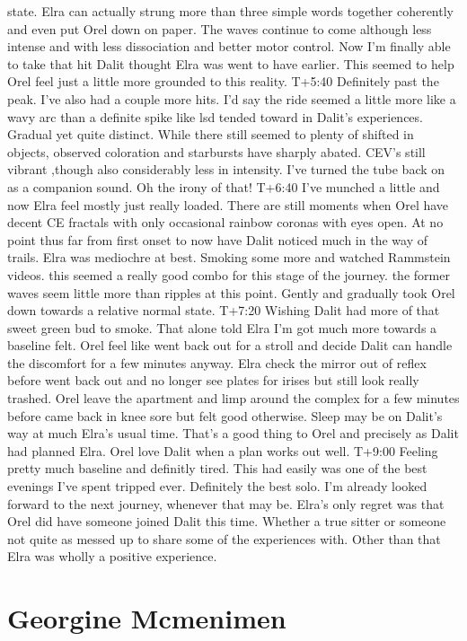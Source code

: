 \documentclass[12pt]{book}
\begin{document}
state. Elra can actually strung more than three simple words together coherently and even put Orel down on paper. The waves continue to come although less intense and with less dissociation and better motor control. Now I'm finally able to take that hit Dalit thought Elra was went to have earlier. This seemed to help Orel feel just a little more grounded to this reality. T+5:40 Definitely past the peak. I've also had a couple more hits. I'd say the ride seemed a little more like a wavy arc than a definite spike like lsd tended toward in Dalit's experiences. Gradual yet quite distinct. While there still seemed to plenty of shifted in objects, observed coloration and starbursts have sharply abated. CEV's still vibrant ,though also considerably less in intensity. I've turned the tube back on as a companion sound. Oh the irony of that! T+6:40 I've munched a little and now Elra feel mostly just really loaded. There are still moments when Orel have decent CE fractals with only occasional rainbow coronas with eyes open. At no point thus far from first onset to now have Dalit noticed much in the way of trails. Elra was mediochre at best. Smoking some more and watched Rammstein videos. this seemed a really good combo for this stage of the journey. the former waves seem little more than ripples at this point. Gently and gradually took Orel down towards a relative normal state. T+7:20 Wishing Dalit had more of that sweet green bud to smoke. That alone told Elra I'm got much more towards a baseline felt. Orel feel like went back out for a stroll and decide Dalit can handle the discomfort for a few minutes anyway. Elra check the mirror out of reflex before went back out and no longer see plates for irises but still look really trashed. Orel leave the apartment and limp around the complex for a few minutes before came back in knee sore but felt good otherwise. Sleep may be on Dalit's way at much Elra's usual time. That's a good thing to Orel and precisely as Dalit had planned Elra. Orel love Dalit when a plan works out well. T+9:00 Feeling pretty much baseline and definitly tired. This had easily was one of the best evenings I've spent tripped ever. Definitely the best solo. I'm already looked forward to the next journey, whenever that may be. Elra's only regret was that Orel did have someone joined Dalit this time. Whether a true sitter or someone not quite as messed up to share some of the experiences with. Other than that Elra was wholly a positive experience.



\chapter{Georgine Mcmenimen}
\end{document}
